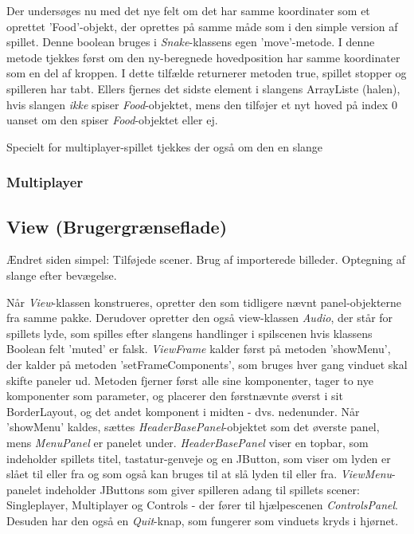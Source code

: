 Der undersøges nu med det nye felt om det har samme koordinater som et oprettet 'Food'-objekt, der oprettes på samme måde som i den simple version af spillet. Denne boolean bruges i \textit{Snake}-klassens egen 'move'-metode. I denne metode tjekkes først om den ny-beregnede hovedposition har samme koordinater som en del af kroppen. I dette tilfælde returnerer metoden true, spillet stopper og spilleren har tabt. Ellers fjernes det sidste element i slangens ArrayListe (halen), hvis slangen \textit{ikke} spiser \textit{Food}-objektet, mens den tilføjer et nyt hoved på index 0 uanset om den spiser \textit{Food}-objektet eller ej.
\linebreak 
   
Specielt for multiplayer-spillet tjekkes der også om den en slange 

\subsubsection{Multiplayer}

\subsection{View (Brugergrænseflade)}
Ændret siden simpel: Tilføjede scener. Brug af importerede billeder. Optegning af slange efter bevægelse.

Når \textit{View}-klassen konstrueres, opretter den som tidligere nævnt panel-objekterne fra samme pakke. Derudover opretter den også view-klassen \textit{Audio}, der står for spillets lyde, som spilles efter slangens handlinger i spilscenen hvis klassens Boolean felt 'muted' er falsk. \textit{ViewFrame} kalder først på metoden 'showMenu', der kalder på metoden 'setFrameComponents', som bruges hver gang vinduet skal skifte paneler ud. Metoden fjerner først alle sine komponenter, tager to nye komponenter som parameter, og placerer den førstnævnte øverst i sit BorderLayout, og det andet komponent i midten - dvs. nedenunder. Når 'showMenu' kaldes, sættes \textit{HeaderBasePanel}-objektet som det øverste panel, mens \textit{MenuPanel} er panelet under. \textit{HeaderBasePanel} viser en topbar, som indeholder spillets titel, tastatur-genveje og en JButton, som viser om lyden er slået til eller fra og som også kan bruges til at slå lyden til eller fra. \textit{ViewMenu}-panelet indeholder JButtons som giver spilleren adang til spillets scener: Singleplayer, Multiplayer og Controls - der fører til hjælpescenen \textit{ControlsPanel}. Desuden har den også en \textit{Quit}-knap, som fungerer som vinduets kryds i hjørnet. 

